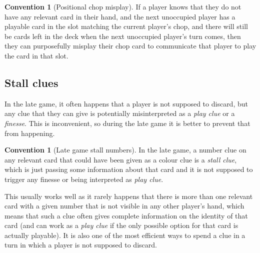 \documentclass[a4paper]{article}
\theoremstyle{plain}
\theoremstyle{definition}
\newtheorem{convention}[theorem]{Convention}
\begin{document}
\begin{convention}[Positional chop misplay]
	If a player knows that they do not have any relevant card in their hand, and the next unoccupied player has a playable card in the slot matching the current player's chop, and there will still be cards left in the deck when the next unoccupied player's turn comes, then they can purposefully misplay their chop card to communicate that player to play the card in that slot.
\end{convention}

\subsection{Stall clues}

In the late game, it often happens that a player is not supposed to discard, but any clue that they can give is potentially misinterpreted as a \emph{play clue} or a \emph{finesse}. This is inconvenient, so during the late game it is better to prevent that from happening.

\begin{convention}[Late game stall numbers]
	In the late game, a number clue on any relevant card that could have been given as a colour clue is a \emph{stall clue}, which is just passing some information about that card and it is not supposed to trigger any finesse or being interpreted as \emph{play clue}.
\end{convention}

This usually works well as it rarely happens that there is more than one relevant card with a given number that is not visible in any other player's hand, which means that such a clue often gives complete information on the identity of that card (and can work as a \emph{play clue} if the only possible option for that card is actually playable). It is also one of the most efficient ways to spend a clue in a turn in which a player is not supposed to discard.
\end{document}
